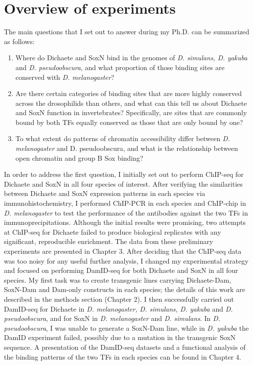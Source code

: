\section{Overview of experiments}
The main questions that I set out to answer during my Ph.D. can be summarized as follows:
\begin{enumerate}
	\item Where do Dichaete and SoxN bind in the genomes of \emph{D. simulans, D. yakuba} and \emph{D. pseudoobscura}, and what proportion of those binding sites are conserved with \emph{D. melanogaster}?
	\item Are there certain categories of binding sites that are more highly conserved across the drosophilids than others, and what can this tell us about Dichaete and SoxN function in invertebrates? Specifically, are sites that are commonly bound by both TFs equally conserved as those that are only bound by one?
	\item To what extent do patterns of chromatin accessibility differ between \emph{D. melanogaster} and {D. pseudoobscura}, and what is the relationship between open chromatin and group B Sox binding?
\end{enumerate}

In order to address the first question, I initially set out to perform ChIP-seq for Dichaete and SoxN in all four species of interest. After verifying the similarities between Dichaete and SoxN expression patterns in each species via immunohistochemistry, I performed ChIP-PCR in each species and ChIP-chip in \emph{D. melanogaster} to test the performance of the antibodies against the two TFs in immunoprecipitations. Although the initial results were promising, two attempts at ChIP-seq for Dichaete failed to produce biological replicates with any significant, reproducible enrichment. The data from these preliminary experiments are presented in Chapter 3. After deciding that the ChIP-seq data was too noisy for any useful further analysis, I changed my experimental strategy and focused on performing DamID-seq for both Dichaete and SoxN in all four species. My first task was to create transgenic lines carrying Dichaete-Dam, SoxN-Dam and Dam-only constructs in each species; the details of this work are described in the methods section (Chapter 2). I then successfully carried out DamID-seq for Dichaete in \emph{D. melanogaster, D. simulans, D. yakuba} and \emph{D. pseudoobscura}, and for SoxN in \emph{D. melanogaster} and \emph{D. simulans}. In \emph{D. pseudoobscura}, I was unable to generate a SoxN-Dam line, while in \emph{D. yakuba} the DamID experiment failed, possibly due to a mutation in the transgenic SoxN sequence. A presentation of the DamID-seq datasets and a functional analysis of the binding patterns of the two TFs in each species can be found in Chapter 4.\\

